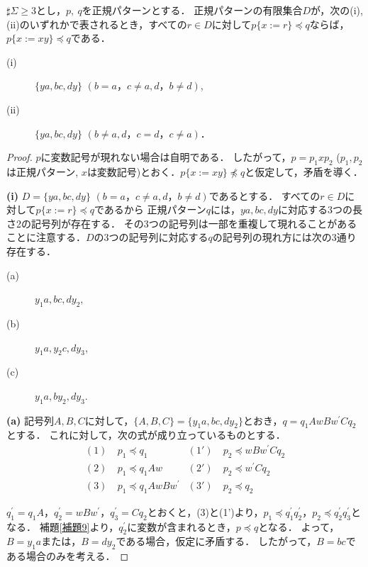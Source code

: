 \begin{lem}\label{片方}
$\sharp \Sigma \ge 3$とし，$p,~q$を正規パターンとする．
正規パターンの有限集合$D$が，次の{\rm (i), (ii)}のいずれかで表されるとき，すべての$r \in D$に対して$p \{ x := r \} \preceq q$ならば，$p \{ x := xy \} \preceq q$である．

\begin{description}
\item[{\rm (i)}] $\{ ya, bc, dy \}$ $(b = a，c \not = a,d，b \not = d)$,
\item[{\rm (ii)}] $\{ ya, bc, dy \}$ $(b \not = a,d，c = d，c \not = a)$．
\end{description}
\end{lem}
\begin{proof}
$p$に変数記号が現れない場合は自明である．
したがって，$p=p_{1}xp_{2}$ ($p_{1}, p_{2}$は正規パターン, $x$は変数記号)とおく．$p \{ x := xy \} \not \preceq q$と仮定して，矛盾を導く．

\noindent\textbf{(i)}
$D=\{ ya, bc, dy \}$ $(b = a，c \not = a,d，b \not = d)$であるとする．
すべての$r \in D$に対して$p \{ x := r \} \preceq q$であるから
正規パターン$q$には，$ya, bc, dy$に対応する3つの長さ2の記号列が存在する．
その3つの記号列は一部を重複して現れることがあることに注意する．$D$の3つの記号列に対応する$q$の記号列の現れ方には次の3通り存在する．

\begin{description}
\item[(a)] $y_{1}a, bc, dy_{2}$,
\item[(b)] $y_{1}a, y_{2}c, dy_{3}$,
\item[(c)] $y_{1}a, by_{2}, dy_{3}$.
\end{description}

\textbf{(a)}
記号列$A,B,C$に対して，$\{ A,B,C \} = \{ y_{1}a,bc,dy_{2} \}$とおき，$q=q_{1}AwBw^{\prime}Cq_{2}$とする．
これに対して，次の式が成り立っているものとする．
\begin{align*}
(1)~& p_{1} \preceq q_{1} & (1')~& p_{2} \preceq wBw^{\prime}Cq_{2} \\
(2)~& p_{1} \preceq q_{1}Aw & (2')~& p_{2} \preceq w^{\prime}Cq_{2} \\
(3)~& p_{1} \preceq q_{1}AwBw^{\prime} & (3')~& p_{2} \preceq q_{2}
\end{align*}

$q^{\prime}_{1}=q_{1}A，q^{\prime}_{2}=wBw^{\prime}，q^{\prime}_{3}=Cq_{2}$とおくと，(3)と(1')より，$p_{1} \preceq q^{\prime}_{1}q^{\prime}_{2}，p_{2} \preceq q^{\prime}_{2}q^{\prime}_{3}$となる．
補題\ref{補題9}より，$q^{\prime}_{2}$に変数が含まれるとき，$p \preceq q$となる．
よって，$B=y_{1}a$または，$B=dy_{2}$である場合，仮定に矛盾する．
したがって，$B=bc$である場合のみを考える．


\end{proof}
